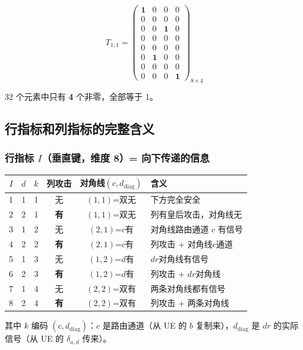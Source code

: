 \documentclass[12pt,a4paper]{article}
\begin{document}
\begin{sumbox}[$T_{1,1}$ 的完整数值矩阵]
$$T_{1,1} = \begin{pmatrix}
\mathbf{1} & 0 & 0 & 0 \\
0 & 0 & 0 & 0 \\
0 & 0 & \mathbf{1} & 0 \\
0 & 0 & 0 & 0 \\
0 & 0 & 0 & 0 \\
0 & \mathbf{1} & 0 & 0 \\
0 & 0 & 0 & 0 \\
0 & 0 & 0 & \mathbf{1}
\end{pmatrix}_{8 \times 4}$$

32 个元素中只有 \textbf{4} 个非零，全部等于 1。
\end{sumbox}

\subsection{行指标和列指标的完整含义}

\subsubsection{行指标 $I$（垂直键，维度 8）= 向下传递的信息}

\begin{center}
\renewcommand{\arraystretch}{1.2}
\begin{tabular}{c|cc|cc|l}
\toprule
$I$ & $d$ & $k$ & 列攻击 & 对角线$(c,d_{\text{diag}})$ & 含义 \\
\midrule
1 & 1 & 1 & 无 & $(1,1)$=双无 & 下方完全安全 \\
2 & 2 & 1 & \textbf{有} & $(1,1)$=双无 & 列有皇后攻击，对角线无 \\
3 & 1 & 2 & 无 & $(2,1)$=$c$有 & 对角线路由通道 $c$ 有信号 \\
4 & 2 & 2 & \textbf{有} & $(2,1)$=$c$有 & 列攻击 + 对角线$c$通道 \\
5 & 1 & 3 & 无 & $(1,2)$=$d$有 & $dr$对角线有信号 \\
6 & 2 & 3 & \textbf{有} & $(1,2)$=$d$有 & 列攻击 + $dr$对角线 \\
7 & 1 & 4 & 无 & $(2,2)$=双有 & 两条对角线都有信号 \\
8 & 2 & 4 & \textbf{有} & $(2,2)$=双有 & 列攻击 + 两条对角线 \\
\bottomrule
\end{tabular}
\end{center}

其中 $k$ 编码 $(c, d_{\text{diag}})$：$c$ 是路由通道（从 UE 的 $b$ 复制来），$d_{\text{diag}}$ 是 $dr$ 的实际信号（从 UE 的 $\delta_{a,d}$ 传来）。
\end{document}
